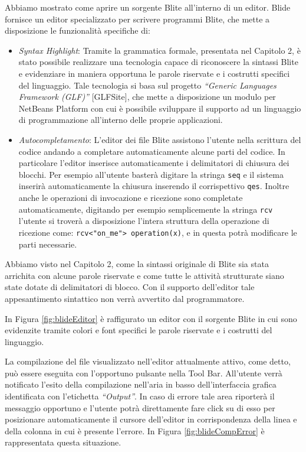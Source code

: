 Abbiamo mostrato come aprire un sorgente Blite all'interno di un editor. Blide
fornisce un editor specializzato per scrivere programmi Blite, che mette a
disposizione le funzionalità specifiche di:

\begin{itemize}
  \item \emph{Syntax Highlight}: Tramite la grammatica formale, presentata
  nel Capitolo 2,  è stato possibile realizzare una tecnologia capace di 
  riconoscere la sintassi Blite e evidenziare in maniera opportuna le parole
  riservate  e i costrutti specifici del linguaggio. Tale tecnologia si basa
  sul progetto \emph{``Generic Languages Framework (GLF)''} [GLFSite], che mette
  a disposizione un modulo per NetBeans Platform con cui è possibile sviluppare 
  il supporto ad un linguaggio di programmazione all'interno delle proprie 
  applicazioni.
  
  \item \emph{Autocompletamento}: L'editor dei file Blite assistono
  l'utente nella scrittura del codice andando a completare automaticamente
  alcune parti del codice. In particolare l'editor inserisce automaticamente i
  delimitatori di chiusura dei blocchi. Per esempio all'utente basterà digitare
  la stringa \texttt{seq} e il sistema inserirà automaticamente la chiusura
  inserendo il corrispettivo \texttt{qes}. Inoltre anche le operazioni di
  invocazione e ricezione sono completate automaticamente, digitando per
  esempio semplicemente la stringa \texttt{rcv} l'utente si troverà a
  disposizione l'intera struttura della operazione di ricezione come: 
  \verb#rcv<"on_me"> operation(x)#, e in questa potrà modificare
  le parti necessarie.
  
\end{itemize}

Abbiamo visto nel Capitolo 2, come la sintassi originale di Blite sia stata
arrichita con alcune parole riservate e come tutte le attività strutturate siano state
dotate di delimitatori di blocco. Con il supporto dell'editor tale
appesantimento sintattico non verrà avvertito dal programmatore.
  
In Figura \ref{fig:blideEditor} è raffigurato un editor con il sorgente Blite in
cui sono evidenzite tramite colori e font specifici le parole riservate e i costrutti
del linguaggio.
	
La compilazione del file visualizzato nell'editor attualmente attivo, come
detto, può essere eseguita con l'opportuno pulsante nella Tool Bar. All'utente
verrà notificato l'esito della compilazione nell'aria in basso
dell'interfaccia grafica identificata con l'etichetta \emph{``Output''}. In caso di
errore tale area riporterà il messaggio opportuno e l'utente potrà direttamente
fare click su di esso per posizionare automaticamente il cursore dell'editor in
corrispondenza della linea e della colonna in cui è presente l'errore. In
Figura \ref{fig:blideCompError} è rappresentata questa situazione.

